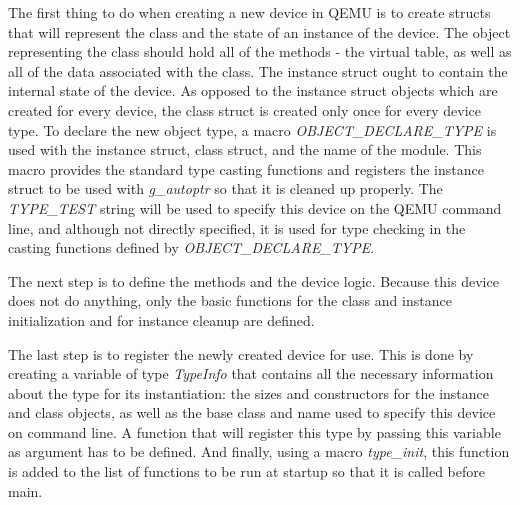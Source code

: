 The first thing to do when creating a new device in QEMU is to create structs that
will represent the class and the state of an instance of the device. The object
representing the class should hold all of the methods - the virtual  table, as
well as all of the data associated with the class. The instance struct ought to
contain the internal state of the device. As opposed to the instance struct
objects which are created for every device, the class struct is created only
once for every device type. To declare the new object type, a macro
\emph{OBJECT\_DECLARE\_TYPE} is used with the instance struct, class struct,
and the name of the module. This macro provides the standard type casting
functions and registers the instance struct to be used with \emph{g\_autoptr}
so that it is cleaned up properly. The \emph{TYPE\_TEST} string will be used to
specify this device on the QEMU command line, and although not directly
specified, it is used for type checking in the casting functions defined by
\emph{OBJECT\_DECLARE\_TYPE}.

\begin{codeblock}
    
\end{codeblock}

The next step is to define the methods and the device logic. Because this
device does not do anything, only the basic functions for the class and instance
initialization and for instance cleanup are defined.

\begin{codeblock}
    
\end{codeblock}

The last step is to register the newly created device for use. This is done by
creating a variable of type \emph{TypeInfo} that contains all the necessary
information about the type for its instantiation: the sizes and constructors
for the instance and class objects, as well as the base class and name used to
specify this device on command line. A function that will register this type by
passing this variable as argument has to be defined. And finally, using a macro
\emph{type\_init}, this function is added to the list of functions to be run at
startup so that it is called before main.

\begin{codeblock}
    
\end{codeblock}

